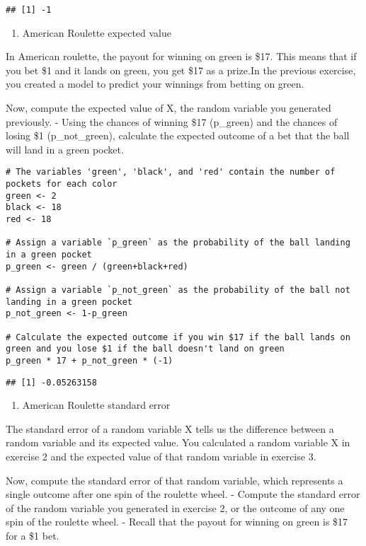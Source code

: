\documentclass[
]{article}
\providecommand{\tightlist}{%
  \setlength{\itemsep}{0pt}\setlength{\parskip}{0pt}}
\begin{document}
\begin{verbatim}
## [1] -1
\end{verbatim}

\begin{enumerate}
\def\labelenumi{\arabic{enumi}.}
\setcounter{enumi}{2}
\tightlist
\item
  American Roulette expected value
\end{enumerate}

In American roulette, the payout for winning on green is \$17. This
means that if you bet \$1 and it lands on green, you get \$17 as a
prize.In the previous exercise, you created a model to predict your
winnings from betting on green.

Now, compute the expected value of X, the random variable you generated
previously. - Using the chances of winning \$17 (p\_green) and the
chances of losing \$1 (p\_not\_green), calculate the expected outcome of
a bet that the ball will land in a green pocket.

\begin{verbatim}
# The variables 'green', 'black', and 'red' contain the number of pockets for each color
green <- 2
black <- 18
red <- 18

# Assign a variable `p_green` as the probability of the ball landing in a green pocket
p_green <- green / (green+black+red)

# Assign a variable `p_not_green` as the probability of the ball not landing in a green pocket
p_not_green <- 1-p_green

# Calculate the expected outcome if you win $17 if the ball lands on green and you lose $1 if the ball doesn't land on green
p_green * 17 + p_not_green * (-1)
\end{verbatim}

\begin{verbatim}
## [1] -0.05263158
\end{verbatim}

\begin{enumerate}
\def\labelenumi{\arabic{enumi}.}
\setcounter{enumi}{3}
\tightlist
\item
  American Roulette standard error
\end{enumerate}

The standard error of a random variable X tells us the difference
between a random variable and its expected value. You calculated a
random variable X in exercise 2 and the expected value of that random
variable in exercise 3.

Now, compute the standard error of that random variable, which
represents a single outcome after one spin of the roulette wheel. -
Compute the standard error of the random variable you generated in
exercise 2, or the outcome of any one spin of the roulette wheel. -
Recall that the payout for winning on green is \$17 for a \$1 bet.
\end{document}
